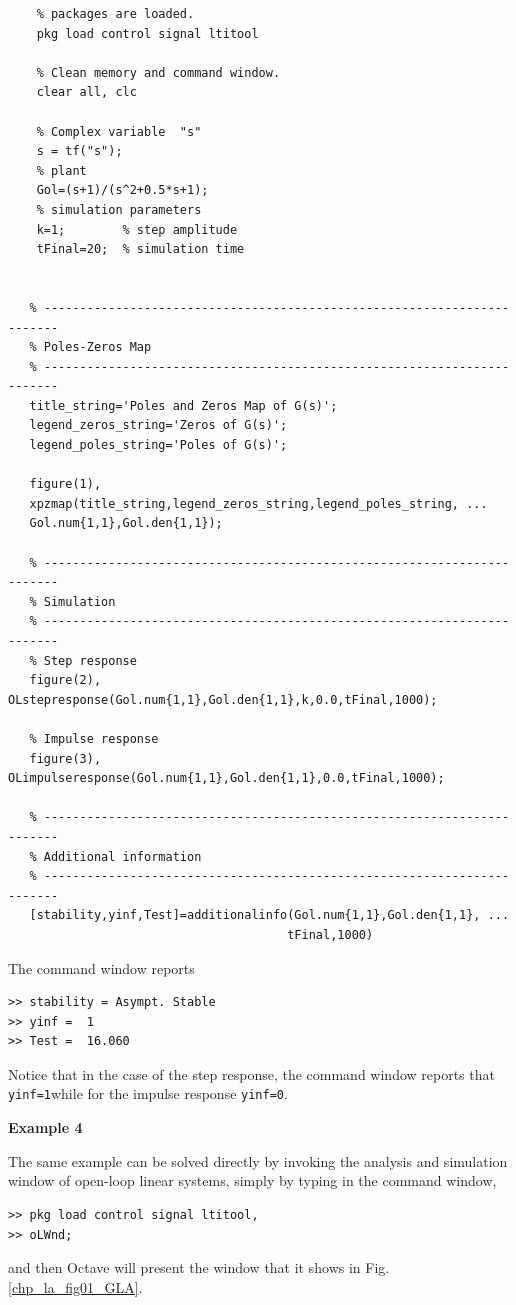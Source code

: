 \begin{verbatim}	
	% packages are loaded.
	pkg load control signal ltitool
	
	% Clean memory and command window.
	clear all, clc
	
	% Complex variable  "s"
    s = tf("s");
    % plant
    Gol=(s+1)/(s^2+0.5*s+1);
    % simulation parameters
    k=1;        % step amplitude
    tFinal=20;  % simulation time


   % ------------------------------------------------------------------------
   % Poles-Zeros Map
   % ------------------------------------------------------------------------
   title_string='Poles and Zeros Map of G(s)';
   legend_zeros_string='Zeros of G(s)';
   legend_poles_string='Poles of G(s)';

   figure(1), 
   xpzmap(title_string,legend_zeros_string,legend_poles_string, ... 
   Gol.num{1,1},Gol.den{1,1});

   % ------------------------------------------------------------------------
   % Simulation
   % ------------------------------------------------------------------------
   % Step response
   figure(2), OLstepresponse(Gol.num{1,1},Gol.den{1,1},k,0.0,tFinal,1000);

   % Impulse response 
   figure(3), OLimpulseresponse(Gol.num{1,1},Gol.den{1,1},0.0,tFinal,1000);

   % ------------------------------------------------------------------------
   % Additional information 
   % ------------------------------------------------------------------------
   [stability,yinf,Test]=additionalinfo(Gol.num{1,1},Gol.den{1,1}, ...
                                       tFinal,1000)
\end{verbatim}

The command window reports
\begin{verbatim}
>> stability = Asympt. Stable
>> yinf =  1
>> Test =  16.060
\end{verbatim}


Notice that in the case of the step response, the command window reports that \texttt{yinf=1}while for the impulse response \texttt{yinf=0}.

\vspace{0.4cm}
\textbf{Example 4}

The same example can be solved directly by invoking the analysis and simulation window  of open-loop linear systems, simply by typing in the command window,
\begin{verbatim}
>> pkg load control signal ltitool,
>> oLWnd;
\end{verbatim}
and then Octave will present the window that it shows in Fig. \ref{chp_la_fig01_GLA}.

